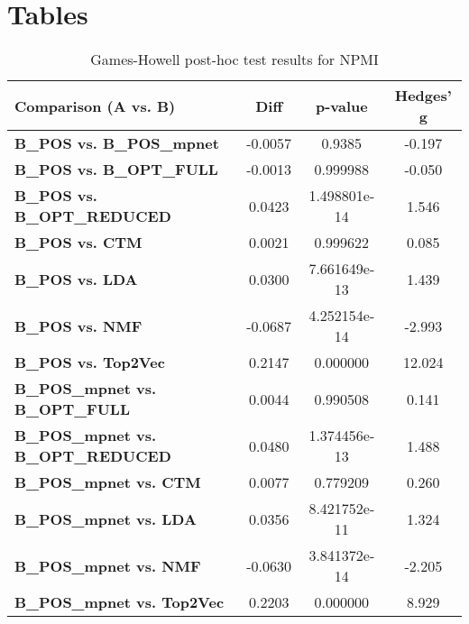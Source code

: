 \chapter{Tables}\label{sec:tables_appendix}

\begin{table}[ht]
    \centering
    \caption{Games-Howell post-hoc test results for NPMI}
    \label{tab:games_howell_npmi}
    \begin{tabular}{lccc}
        \toprule
        \textbf{Comparison (A vs. B)}              & \textbf{Diff} & \textbf{p-value} & \textbf{Hedges' g} \\
        \midrule
        \textbf{B\_POS vs. B\_POS\_mpnet}          & -0.0057       & 0.9385           & -0.197             \\
        \textbf{B\_POS vs. B\_OPT\_FULL}           & -0.0013       & 0.999988         & -0.050             \\
        \textbf{B\_POS vs. B\_OPT\_REDUCED}        & 0.0423        & 1.498801e-14     & 1.546              \\
        \textbf{B\_POS vs. CTM}                    & 0.0021        & 0.999622         & 0.085              \\
        \textbf{B\_POS vs. LDA}                    & 0.0300        & 7.661649e-13     & 1.439              \\
        \textbf{B\_POS vs. NMF}                    & -0.0687       & 4.252154e-14     & -2.993             \\
        \textbf{B\_POS vs. Top2Vec}                & 0.2147        & 0.000000         & 12.024             \\
        \textbf{B\_POS\_mpnet vs. B\_OPT\_FULL}    & 0.0044        & 0.990508         & 0.141              \\
        \textbf{B\_POS\_mpnet vs. B\_OPT\_REDUCED} & 0.0480        & 1.374456e-13     & 1.488              \\
        \textbf{B\_POS\_mpnet vs. CTM}             & 0.0077        & 0.779209         & 0.260              \\
        \textbf{B\_POS\_mpnet vs. LDA}             & 0.0356        & 8.421752e-11     & 1.324              \\
        \textbf{B\_POS\_mpnet vs. NMF}             & -0.0630       & 3.841372e-14     & -2.205             \\
        \textbf{B\_POS\_mpnet vs. Top2Vec}         & 0.2203        & 0.000000         & 8.929              \\

\end{tabular}
\end{table}
